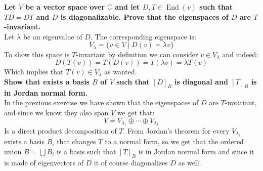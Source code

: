 \documentclass[11pt,a4paper]{article}
\theoremstyle{plain}
\DeclareMathOperator{\End}{End}
\newcommand{\C}{\mathbb{C}}
\begin{document}
	\newpage
	\noindent
	\textbf{Let $V$ be a vector space over $\C$ and let $D,T\in\End(v)$ such
	that $TD = DT$ and $D$ is diagonalizable. Prove that the eigenspaces of $D$
	are $T$-invariant.} \\
	Let $\lambda$ be an eigenvalue of $D$. The corresponding eigenspace is:
	\[
		V_\lambda = \{v \in V \mid D(v) = \lambda v \}
	\]
	To show this space is $T$-invariant by definition we can consider 
	$v\in V_\lambda$ and indeed:
	\[
		D(T(v)) = T(D(v)) = T(\lambda v) = \lambda T(v)
	\]
	Which implies that $T(v)\in V_\lambda$ as wanted. \\
	\textbf{Show that exists a basis $B$ of $V$ such that $[D]_B$ is diagonal
	and $[T]_B$ is in Jordan normal form.} \\
	In the previous exercise we have shown that the eigenspaces of $D$ are
	$T$-invariant, and since we know they also span $V$ we get that:
	\[
		V = V_{\lambda_1} \oplus \cdots \oplus V_{\lambda_k}
	\]
	Is a direct product decomposition of $T$. From Jordan's theorem
	for every $V_{\lambda_i}$ exists a basis $B_i$ that changes $T$ to a normal
	form, so we get that the ordered union $B = \bigcup B_i$ is a basis
	such that $[T]_B$ is in Jordan normal form and since it is made of
	eigenvectors of $D$ it of course diagonalizes $D$ as well.
	
\end{document}
